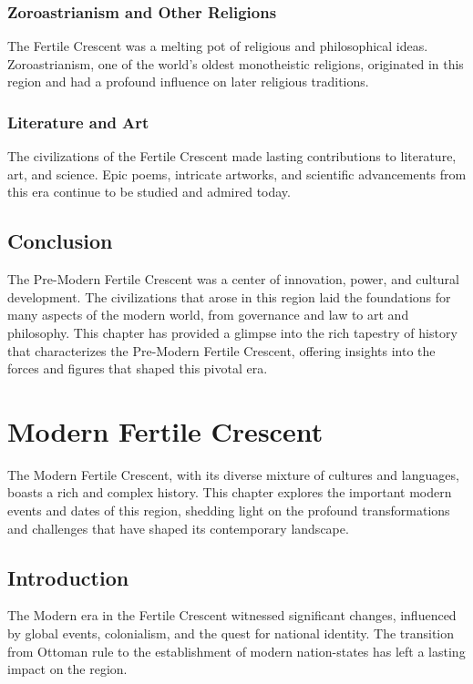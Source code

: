 \documentclass[a4paper,12pt]{book}
\begin{document}
\subsection{Zoroastrianism and Other Religions}
The Fertile Crescent was a melting pot of religious and philosophical ideas. Zoroastrianism, one of the world’s oldest monotheistic religions, originated in this region and had a profound influence on later religious traditions.

\subsection{Literature and Art}
The civilizations of the Fertile Crescent made lasting contributions to literature, art, and science. Epic poems, intricate artworks, and scientific advancements from this era continue to be studied and admired today.

\section{Conclusion}
\label{sec:conclusion-fertile-crescent}

The Pre-Modern Fertile Crescent was a center of innovation, power, and cultural development. The civilizations that arose in this region laid the foundations for many aspects of the modern world, from governance and law to art and philosophy. This chapter has provided a glimpse into the rich tapestry of history that characterizes the Pre-Modern Fertile Crescent, offering insights into the forces and figures that shaped this pivotal era.

\chapter{Modern Fertile Crescent}
\label{ch:modern-fertile-crescent}

The Modern Fertile Crescent, with its diverse mixture of cultures and languages, boasts a rich and complex history. This chapter explores the important modern events and dates of this region, shedding light on the profound transformations and challenges that have shaped its contemporary landscape.

\section{Introduction}
\label{sec:introduction-modern-fertile-crescent}

The Modern era in the Fertile Crescent witnessed significant changes, influenced by global events, colonialism, and the quest for national identity. The transition from Ottoman rule to the establishment of modern nation-states has left a lasting impact on the region.
\end{document}
